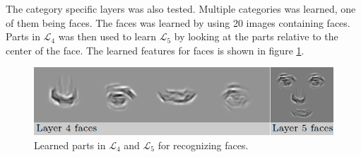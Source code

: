 The category specific layers was also tested. Multiple categories was learned, one of them being faces. 
The faces was learned by using 20 images containing faces. Parts in $\mathcal{L}_{4}$ was then used to learn $\mathcal{L}_{5}$ by  looking at the parts relative to the center of the face. 
The learned features for faces is shown in figure \ref{fig:layer4-5}.


\begin{figure}[h!] %
\centering
\includegraphics[scale=0.7]{graphics/layer4_5_faces}
\caption{Learned parts in $\mathcal{L}_{4}$ and $\mathcal{L}_{5}$ for recognizing faces. 
\cite[fig.~10]{fidler2009learning}}
\label{fig:layer4-5}
\end{figure}

